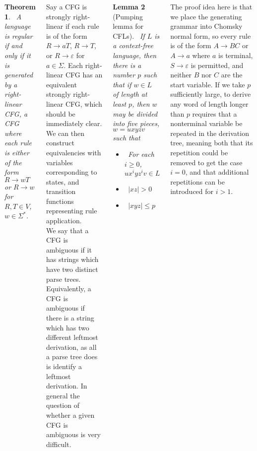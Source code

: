\documentclass{tikzposter} %
\newtheorem{theorem}{Theorem}
\newtheorem{lemma}[theorem]{Lemma}
\begin{document}
\begin{columns}
{      \begin{theorem}
      \ A language is regular if and only if it is generated by a right-linear CFG, a CFG where each rule is either of the form $R \to wT$ or $R \to w$ for $R, T \in V$, $w \in \Sigma^{*}$.
      \end{theorem}
      \hphantom{}

      Say a CFG is strongly right-linear if each rule is of the form $R \to aT$, $R \to T$, or $R \to \varepsilon$ for $a \in \Sigma$. Each right-linear CFG has an equivalent strongly right-linear CFG, which should be immediately clear. We can then construct equivalencies with variables corresponding to states, and transition functions representing rule application. \\

      We say that a CFG is ambiguous if it has strings which have two distinct parse trees. Equivalently, a CFG is ambiguous if there is a string which has two different leftmost derivation, as all a parse tree does is identify a leftmost derivation. In general the question of whether a given CFG is ambiguous is very difficult. \\

      \begin{lemma}[Pumping lemma for CFLs]
      \ If $L$ is a context-free language, then there is a number $p$ such that if $w \in L$ of length at least $p$, then $w$ may be divided into five pieces, $w = u x y z v$ such that
        \begin{itemize}
                \item \ For each $i \ge 0$, $u x^{i} y z^{i} v \in L$
                \item \ $|xz| > 0$
                \item \ $|x y z| \le p$
        \end{itemize}
      \end{lemma}
      \hphantom{}

      The proof idea here is that we place the generating grammar into Chomsky normal form, so every rule is of the form $A \to BC$ or $A \to a$ where $a$ is terminal, $S \to \varepsilon$ is permitted, and neither $B$ nor $C$ are the start variable. If we take $p$ sufficiently large, to derive any word of length longer than $p$ requires that a nonterminal variable be repeated in the derivation tree, meaning both that its repetition could be removed to get the case $i = 0$, and that additional repetitions can be introduced for $i > 1$.
    }


\end{columns}
\end{document}
